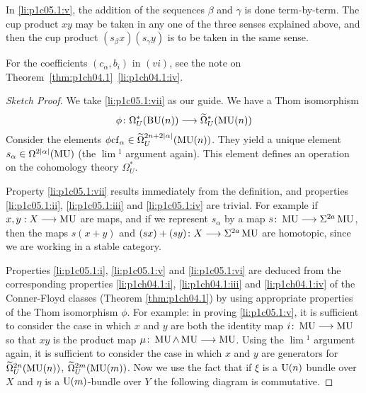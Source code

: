 \documentclass[../main]{subfiles}
\begin{document}
\begin{explanation}
	In \ref{li:p1c05.1:v}, the addition of the sequences $\beta$ and $\gamma$ is done term-by-term. 
	The cup product $xy$ may be taken in any one of the three senses explained above, and then the cup product $(s_\beta x)(s_\gamma y)$ is to be taken in the same sense.
	
	For the coefficients $(c_\alpha, b_i)$ in $(vi)$, see the note on Theorem~\ref*{thm:p1ch04.1}~\ref{li:p1ch04.1:iv}.
\end{explanation}

\begin{proof}[Sketch Proof]
We take \ref{li:p1c05.1:vii} as our guide. 
We have a Thom isomorphism 
\begin{equation*}
	\phi\colon \Omega_U^\ast(\mathrm{BU}(n)) \longrightarrow \widetilde{\Omega}_U^\ast(\mathrm{MU}(n))
\end{equation*}
Consider the elements $\phi \mathrm{cf}_\alpha \in \widetilde{\Omega}_U^{2n + 2\lvert\alpha\rvert}(\mathrm{MU}(n))$. 
They yield a unique element $s_\alpha \in \Omega^{2\lvert\alpha\rvert}(\operatorname{MU})$ (the $\lim\!^1$ argument again). This element defines an operation on the cohomology theory $\Omega_U^\ast.$

Property \ref{li:p1c05.1:vii} results immediately from the definition, and properties \ref{li:p1c05.1:ii}, \ref{li:p1c05.1:iii} and \ref{li:p1c05.1:iv} are trivial. 
For example if $x, y : X \longrightarrow \operatorname{MU}$ are maps, and if we represent $s_\alpha$ by a map $s\colon \operatorname{MU} \longrightarrow \Sigma^{2a}\operatorname{MU}$, then the maps $s(x + y)$ and $(sx)+(sy) \colon X \longrightarrow \Sigma^{2a} \operatorname{MU}$ are homotopic, since we are working in a stable category.

Properties \ref{li:p1c05.1:i}, \ref{li:p1c05.1:v} and \ref{li:p1c05.1:vi} are deduced from the corresponding properties \ref{li:p1ch04.1:i}, \ref{li:p1ch04.1:iii} and \ref{li:p1ch04.1:iv} of the Conner-Floyd classes (Theorem \ref{thm:p1ch04.1}) by using appropriate properties of the Thom isomorphism $\phi$.
For example: in proving \ref{li:p1c05.1:v}, it is sufficient to consider the case in which $x$ and $y$  are both the identity map $i\colon \operatorname{MU} \longrightarrow \operatorname{MU}$ so that $x y$ is the product map $\mu\colon \operatorname{MU} \wedge \operatorname{MU} \longrightarrow \operatorname{MU}$. 
Using the $\lim\!^1$ argument again, it is sufficient to consider the case in which $x$ and $y$ are generators for ${\widetilde{\Omega}}_U^{2n}(\mathrm{MU}(n))$, ${\widetilde{\Omega}}_U^{2m}(\mathrm{MU}(m))$. 
Now we use the fact that if $\xi$ is a $\mathrm{U}(n)$ bundle over $X$ and $\eta$ is a $\mathrm{U}(m)$-bundle over $Y$ the following diagram is commutative. 


\end{proof}
\end{document}
